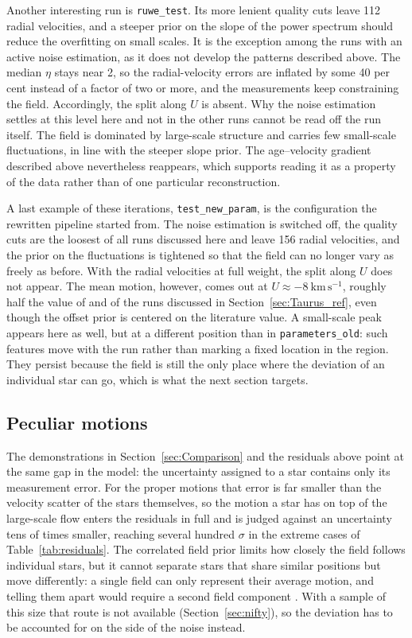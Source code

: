Another interesting run is \texttt{ruwe\_test}. Its more lenient quality cuts leave 112 radial velocities, and a
steeper prior on the slope of the power spectrum should reduce the overfitting on small scales. It is the
exception among the runs with an active noise estimation, as it does not develop the patterns described
above. The median $\eta$ stays near 2, so the radial-velocity errors are inflated by some 40 per cent
instead of a factor of two or more, and the measurements keep constraining the field. Accordingly, the split along
$U$ is absent. Why the noise estimation settles at this level here and not in the other runs cannot be read
off the run itself. The field is dominated by large-scale structure and carries few small-scale
fluctuations, in line with the steeper slope prior. The age--velocity gradient described above nevertheless
reappears, which supports reading it as a property of the data rather than of one particular reconstruction.

A last example of these iterations, \texttt{test\_new\_param}, is the configuration the rewritten pipeline
started from. The noise estimation is switched off, the quality cuts are the
loosest of all runs discussed here and leave 156 radial velocities, and the prior on the fluctuations is
tightened so that the field can no longer vary as freely as before. With the radial velocities at full weight, the split along $U$ does
not appear. The mean motion, however, comes out at $U \approx -8~\mathrm{km\,s^{-1}}$, roughly half the
value of \citet{Galli2019} and of the runs discussed in Section~\ref{sec:Taurus_ref}, even though the
offset prior is centered on the literature value. A small-scale peak appears here as well, but at a
different position than in \texttt{parameters\_old}: such features move with the run rather than marking a
fixed location in the region. They persist because the field is still the only place where the deviation
of an individual star can go, which is what the next section targets.

\subsection{Peculiar motions}
\label{sec:peculiar_motions}

The demonstrations in Section~\ref{sec:Comparison} and the residuals above point at the same gap in
the model: the uncertainty assigned to a star contains only its measurement error. For the proper
motions that error is far smaller than the velocity scatter of the stars themselves, so the motion a
star has on top of the large-scale flow enters the residuals in full and is judged against an
uncertainty tens of times smaller, reaching several hundred $\sigma$ in the extreme cases of
Table~\ref{tab:residuals}. The correlated field prior
limits how closely the field follows individual stars, but it cannot separate stars that share similar
positions but move differently: a single field can only represent their average motion, and telling
them apart would require a second field component \citep{Hutschenreuter2026}. With a sample of this size that route is not available
(Section~\ref{sec:nifty}), so the deviation has to be accounted for on the side of the noise instead.

